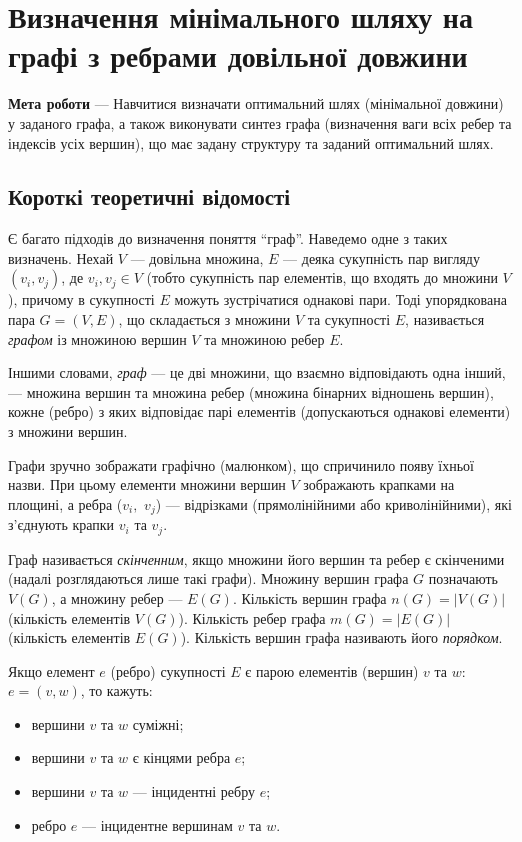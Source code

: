 \chapter[~]{Визначення мінімального шляху на графі з ребрами довільної довжини}

\textbf{Мета роботи} --- Навчитися визначати оптимальний шлях (мінімальної довжини) у заданого
графа, а також виконувати синтез графа (визначення ваги всіх ребер та індексів усіх вершин), що має
задану структуру та заданий оптимальний шлях.

\section{ Короткі теоретичні відомості}

Є багато підходів до визначення поняття ``граф''. Наведемо одне з таких визначень. Нехай $V$ ---
довільна множина, $E$ --- деяка сукупність пар вигляду $(v_i , v_j)$, де $v_i , v_j \in V$ (тобто
сукупність пар елементів, що входять до множини $V$), причому в сукупності $E$ можуть зустрічатися
однакові пари. Тоді упорядкована пара $G=(V, E)$, що складається з множини $V$ та сукупності $E$,
називається \emph{графом} із множиною вершин $V$ та множиною ребер $E$.

Іншими словами, \emph{граф} --- це дві множини, що взаємно відповідають одна інший, --- множина вершин
та множина ребер (множина бінарних відношень вершин), кожне (ребро) з яких відповідає парі елементів
(допускаються однакові елементи) з множини вершин.

Графи зручно зображати графічно (малюнком), що спричинило появу їхньої назви. При цьому елементи
множини вершин $V$ зображають крапками на площині, а ребра ($v_i,$ $v_j$) --- відрізками
(прямолінійними або криволінійними), які з'єднують крапки $v_i$ та $v_j$.

Граф називається \emph{скінченним}, якщо множини його вершин та ребер є скінченими (надалі
розглядаються лише такі графи). Множину вершин графа $G$ позначають $V(G)$, а множину ребер ---
$E(G)$. Кількість вершин графа $n(G)=|V(G)|$ (кількість елементів $V(G)$). Кількість ребер графа
$m(G)=|E(G)|$ (кількість елементів $E(G)$). Кількість вершин графа називають його \emph{порядком}.

Якщо елемент $e$ (ребро) сукупності $E$ є парою елементів (вершин) $v$ та $w$: $e = (v, w)$, то
кажуть:

\begin{itemize}
\item вершини $v$ та $w$ суміжні;
\item вершини $v$ та $w$ є кінцями ребра $e$;
\item вершини $v$ та $w$ --- інцидентні ребру $e$;
\item ребро $e$ --- інцидентне вершинам $v$ та $w$.
\end{itemize}

